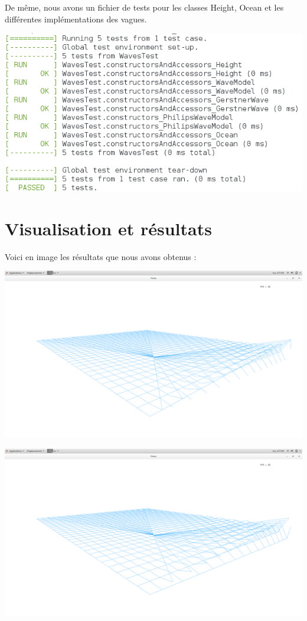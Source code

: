 \documentclass{article}
\begin{document}
\vspace{0.5cm}

De même, nous avons un fichier de tests pour les classes Height, Ocean et les différentes implémentations des vagues.

\vspace{0.5cm}

\includegraphics[scale=0.7]{./res/Test_Waves.png}

\vspace{1cm}


\section{Visualisation et résultats}

Voici en image les résultats que nous avons obtenus :

\vspace{0.5cm}

\includegraphics[scale=0.2]{./res/1.png}

\vspace{0.5cm}

\includegraphics[scale=0.2]{./res/2.png}
\end{document}
